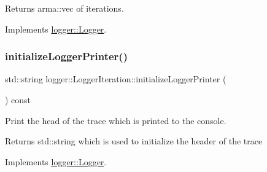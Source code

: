 \begin{DoxyReturn}{Returns}
{\ttfamily arma\+::vec} of iterations. 
\end{DoxyReturn}


Implements \mbox{\hyperlink{classlogger_1_1_logger_aa4fc254c532172db3404b7c0bcd17092}{logger\+::\+Logger}}.

\mbox{\label{classlogger_1_1_logger_iteration_a051c69a2577e023160ec8ccd080dd59f}} 
\subsubsection{\texorpdfstring{initialize\+Logger\+Printer()}{initializeLoggerPrinter()}}
{\footnotesize\ttfamily std\+::string logger\+::\+Logger\+Iteration\+::initialize\+Logger\+Printer (\begin{DoxyParamCaption}{ }\end{DoxyParamCaption}) const\hspace{0.3cm}{\ttfamily [virtual]}}



Print the head of the trace which is printed to the console. 

\begin{DoxyReturn}{Returns}
{\ttfamily std\+::string} which is used to initialize the header of the trace 
\end{DoxyReturn}


Implements \mbox{\hyperlink{classlogger_1_1_logger_a825f96e8564ac4013ff09ef842c0aeec}{logger\+::\+Logger}}.

\mbox{\label{classlogger_1_1_logger_iteration_a155e7fd8c8130211f54804c5ff3a054b}} 
